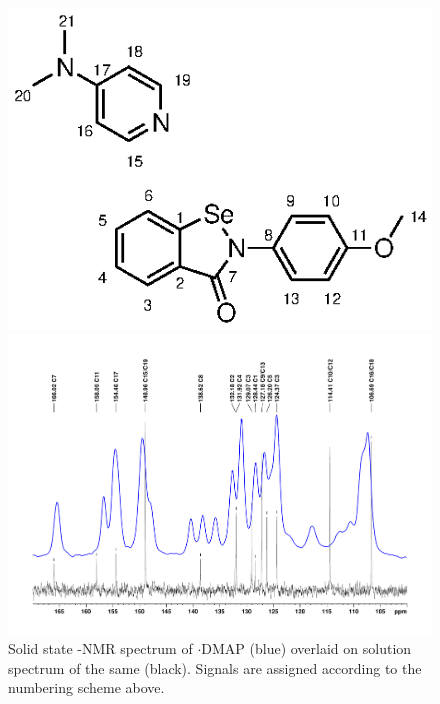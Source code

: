 \begin{refsection}
\begin{figure}
    \centering
    \includegraphics[scale=0.74]{Figures/numbering.eps}

    \includegraphics[width=\linewidth]{Figures/ebs-4ome-dmap-cpmas-sol-13c.pdf}
    \caption{Solid state -NMR spectrum of $\cdot$DMAP (blue) overlaid on solution spectrum of the same (black). Signals are assigned according to the numbering scheme above.}
    \label{fig:cpmas-sol-13c}
\end{figure}


\end{refsection}

